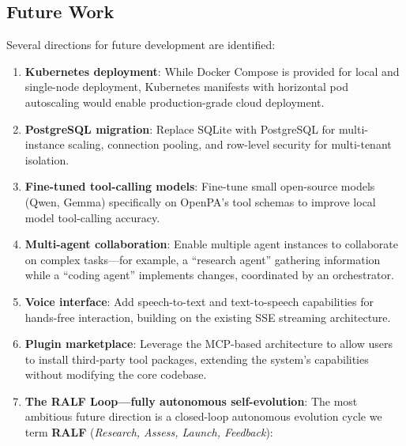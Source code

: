\subsection{Future Work}

Several directions for future development are identified:

\begin{enumerate}[leftmargin=*]
  \item \textbf{Kubernetes deployment}: While Docker Compose is provided for local and single-node deployment, Kubernetes manifests with horizontal pod autoscaling would enable production-grade cloud deployment.

  \item \textbf{PostgreSQL migration}: Replace SQLite with PostgreSQL for multi-instance scaling, connection pooling, and row-level security for multi-tenant isolation.

  \item \textbf{Fine-tuned tool-calling models}: Fine-tune small open-source models (Qwen, Gemma) specifically on OpenPA's tool schemas to improve local model tool-calling accuracy.

  \item \textbf{Multi-agent collaboration}: Enable multiple agent instances to collaborate on complex tasks---for example, a ``research agent'' gathering information while a ``coding agent'' implements changes, coordinated by an orchestrator.

  \item \textbf{Voice interface}: Add speech-to-text and text-to-speech capabilities for hands-free interaction, building on the existing SSE streaming architecture.

  \item \textbf{Plugin marketplace}: Leverage the MCP-based architecture to allow users to install third-party tool packages, extending the system's capabilities without modifying the core codebase.

  \item \textbf{The RALF Loop---fully autonomous self-evolution}: The most ambitious future direction is a closed-loop autonomous evolution cycle we term \textbf{RALF} (\textit{Research, Assess, Launch, Feedback}):


\end{enumerate}
